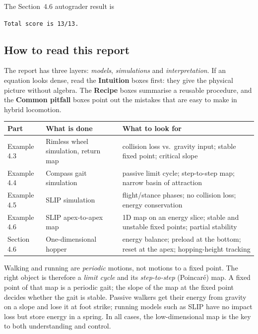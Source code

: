 \documentclass[11pt]{article}
\begin{document}
The Section~4.6 autograder result is
\begin{center}
\texttt{Total score is 13/13.}
\end{center}

\subsection*{How to read this report}

The report has three layers: \emph{models}, \emph{simulations} and
\emph{interpretation}.  If an equation looks dense, read the
\textbf{Intuition} boxes first: they give the physical picture without
algebra.  The \textbf{Recipe} boxes summarise a reusable procedure, and the
\textbf{Common pitfall} boxes point out the mistakes that are easy to make in
hybrid locomotion.

\begin{center}
\small
\begin{tabular}{p{}p{}p{}}
\toprule
Part & What is done & What to look for \\
\midrule
Example 4.3 & Rimless wheel simulation, return map & collision loss vs.\
gravity input; stable fixed point; critical slope \\
Example 4.4 & Compass gait simulation & passive limit cycle; step-to-step
map; narrow basin of attraction \\
Example 4.5 & SLIP simulation & flight/stance phases; no collision loss;
energy conservation \\
Example 4.6 & SLIP apex-to-apex map & 1D map on an energy slice; stable and
unstable fixed points; partial stability \\
Section 4.6 & One-dimensional hopper & energy balance; preload at the bottom;
reset at the apex; hopping-height tracking \\
\bottomrule
\end{tabular}
\end{center}

\begin{intuition}[breakable=false,title={The big picture in five sentences}]
Walking and running are \emph{periodic} motions, not motions to a fixed
point.  The right object is therefore a \emph{limit cycle} and its
\emph{step-to-step} (Poincar\'e) map.  A fixed point of that map is a periodic
gait; the slope of the map at the fixed point decides whether the gait is
stable.  Passive walkers get their energy from gravity on a slope and lose it
at foot strike; running models such as SLIP have no impact loss but store
energy in a spring.  In all cases, the low-dimensional map is the key to both
understanding and control.
\end{intuition}
\end{document}
